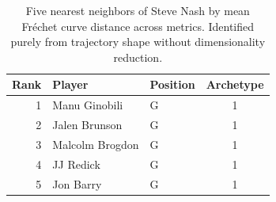\begin{table}[htbp]
  \centering\small
  \begin{tabular}{rllc}
    \toprule
    Rank & Player & Position & Archetype \\
    \midrule
    1 & Manu Ginobili & G & 1 \\
    2 & Jalen Brunson & G & 1 \\
    3 & Malcolm Brogdon & G & 1 \\
    4 & JJ Redick & G & 1 \\
    5 & Jon Barry & G & 1 \\
    \bottomrule
  \end{tabular}
  \caption{Five nearest neighbors of Steve Nash by mean Fr\'{e}chet curve distance across metrics. Identified purely from trajectory shape without dimensionality reduction.}
  \label{tab:Steve_Nash_frechet_curve_neighbors}
\end{table}

